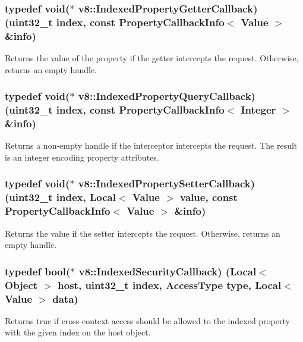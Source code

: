 \subsubsection[{\texorpdfstring{Indexed\+Property\+Getter\+Callback}{IndexedPropertyGetterCallback}}]{\setlength{\rightskip}{0pt plus 5cm}typedef void($\ast$ v8\+::\+Indexed\+Property\+Getter\+Callback) (uint32\+\_\+t index, const {\bf Property\+Callback\+Info}$<$ {\bf Value} $>$ \&info)}\hypertarget{namespacev8_a48e7816ba64447bf32a25d194588daaf}{}\label{namespacev8_a48e7816ba64447bf32a25d194588daaf}
Returns the value of the property if the getter intercepts the request. Otherwise, returns an empty handle. 
\subsubsection[{\texorpdfstring{Indexed\+Property\+Query\+Callback}{IndexedPropertyQueryCallback}}]{\setlength{\rightskip}{0pt plus 5cm}typedef void($\ast$ v8\+::\+Indexed\+Property\+Query\+Callback) (uint32\+\_\+t index, const {\bf Property\+Callback\+Info}$<$ {\bf Integer} $>$ \&info)}\hypertarget{namespacev8_a980b62c33eb664783e61e25c3b27f9ee}{}\label{namespacev8_a980b62c33eb664783e61e25c3b27f9ee}
Returns a non-\/empty handle if the interceptor intercepts the request. The result is an integer encoding property attributes. 
\subsubsection[{\texorpdfstring{Indexed\+Property\+Setter\+Callback}{IndexedPropertySetterCallback}}]{\setlength{\rightskip}{0pt plus 5cm}typedef void($\ast$ v8\+::\+Indexed\+Property\+Setter\+Callback) (uint32\+\_\+t index, {\bf Local}$<$ {\bf Value} $>$ value, const {\bf Property\+Callback\+Info}$<$ {\bf Value} $>$ \&info)}\hypertarget{namespacev8_a4ac7cc6185ebc8b6a199f9fa8e6bf5c3}{}\label{namespacev8_a4ac7cc6185ebc8b6a199f9fa8e6bf5c3}
Returns the value if the setter intercepts the request. Otherwise, returns an empty handle. 
\subsubsection[{\texorpdfstring{Indexed\+Security\+Callback}{IndexedSecurityCallback}}]{\setlength{\rightskip}{0pt plus 5cm}typedef bool($\ast$ v8\+::\+Indexed\+Security\+Callback) ({\bf Local}$<$ {\bf Object} $>$ host, uint32\+\_\+t index, {\bf Access\+Type} type, {\bf Local}$<$ {\bf Value} $>$ data)}\hypertarget{namespacev8_aebbcc7837753e51112d944ad96520da1}{}\label{namespacev8_aebbcc7837753e51112d944ad96520da1}
Returns true if cross-\/context access should be allowed to the indexed property with the given index on the host object. 
